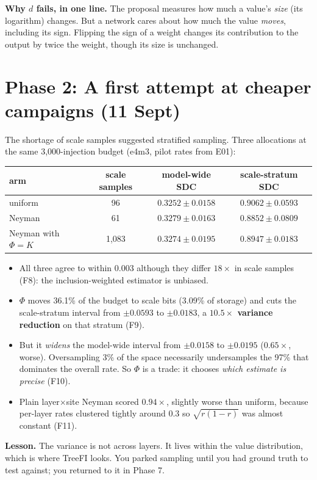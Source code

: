 \begin{plain}
\textbf{Why $d$ fails, in one line.} The proposal measures how much a value's \emph{size} (its logarithm) changes. But a network cares about how much the value \emph{moves}, including its sign. Flipping the sign of a weight changes its contribution to the output by twice the weight, though its size is unchanged.
\end{plain}

\section{Phase 2: A first attempt at cheaper campaigns (11 Sept)}
The shortage of scale samples suggested stratified sampling. Three allocations at the same 3{,}000-injection budget (e4m3, pilot rates from E01):
\begin{center}
\small
\begin{tabular}{lccc}
\toprule
arm & scale samples & model-wide SDC & scale-stratum SDC \\
\midrule
uniform & 96 & $0.3252\pm0.0158$ & $0.9062\pm0.0593$ \\
Neyman & 61 & $0.3279\pm0.0163$ & $0.8852\pm0.0809$ \\
Neyman with $\Phi=K$ & 1{,}083 & $0.3274\pm0.0195$ & $0.8947\pm0.0183$ \\
\bottomrule
\end{tabular}
\end{center}
\begin{itemize}
\item All three agree to within 0.003 although they differ $18\times$ in scale samples (F8): the inclusion-weighted estimator is unbiased.
\item $\Phi$ moves 36.1\% of the budget to scale bits (3.09\% of storage) and cuts the scale-stratum interval from $\pm0.0593$ to $\pm0.0183$, a \textbf{$10.5\times$ variance reduction} on that stratum (F9).
\item But it \emph{widens} the model-wide interval from $\pm0.0158$ to $\pm0.0195$ ($0.65\times$, worse). Oversampling 3\% of the space necessarily undersamples the 97\% that dominates the overall rate. So $\Phi$ is a trade: it chooses \emph{which estimate is precise} (F10).
\item Plain layer$\times$site Neyman scored $0.94\times$, slightly worse than uniform, because per-layer rates clustered tightly around 0.3 so $\sqrt{r(1-r)}$ was almost constant (F11).
\end{itemize}
\textbf{Lesson.} The variance is not across layers. It lives within the value distribution, which is where TreeFI looks. You parked sampling until you had ground truth to test against; you returned to it in Phase 7.

